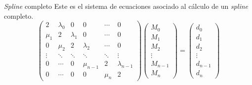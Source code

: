 \begin{frame}{\textit{Spline} completo}
    Este es el sistema de ecuaciones asociado al cálculo
    de un \textit{spline} completo.
    \[
    \begin{pmatrix}
        2 & \lambda_0 & 0 & 0 & \cdots & 0\\
        \mu_1 & 2 & \lambda_1 & 0 & \cdots & 0\\
        0 & \mu_2 & 2 & \lambda_2 & \cdots & 0\\
        \vdots & \ddots& \ddots & \ddots & \ddots & \vdots\\
        0 & \cdots & 0 & \mu_{n-1} & 2 & \lambda_{n-1}\\
        0 & \cdots & 0 & 0 & \mu_{n} & 2 
    \end{pmatrix}
    \begin{pmatrix}
        M_0 \\ M_1 \\ M_2 \\ \vdots \\ M_{n-1} \\ M_{n}
    \end{pmatrix}
    =
    \begin{pmatrix}
        d_0 \\ d_1 \\ d_2 \\ \vdots \\ d_{n-1} \\ d_{n}
    \end{pmatrix}
    \]
\end{frame}
